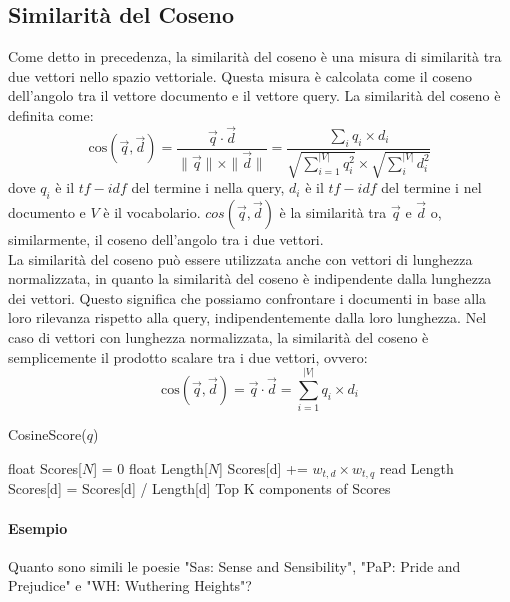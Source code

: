 \documentclass{report}
\begin{document}
	\subsection{Similarità del Coseno}
	Come detto in precedenza, la similarità del coseno è una misura di similarità tra due vettori nello spazio vettoriale. Questa misura è calcolata come il coseno dell'angolo tra il vettore documento e il vettore query. La similarità del coseno è definita come:
	\[
	\text{cos}(\overrightarrow{q}, \overrightarrow{d}) = \frac{\overrightarrow{q} \cdot \overrightarrow{d}}{\| \overrightarrow{q} \| \times \| \overrightarrow{d} \|} = \frac{\sum_{i} q_{i} \times d_{i}}{\sqrt{\sum_{i=1}^{|V|} q_{i}^{2}} \times \sqrt{\sum_{i}^{|V|} d_{i}^{2}}}
	\]
	dove $q_i$ è il $tf-idf$ del termine i nella query, $d_i$ è il $tf-idf$ del termine i nel documento e $V$ è il vocabolario. $cos(\overrightarrow{q}, \overrightarrow{d})$ è la similarità tra $\overrightarrow{q}$ e $\overrightarrow{d}$ o, similarmente, il coseno dell'angolo tra i due vettori.
	\vspace{\baselineskip}\\
	La similarità del coseno può essere utilizzata anche con vettori di lunghezza normalizzata, in quanto la similarità del coseno è indipendente dalla lunghezza dei vettori. Questo significa che possiamo confrontare i documenti in base alla loro rilevanza rispetto alla query, indipendentemente dalla loro lunghezza.
	Nel caso di vettori con lunghezza normalizzata, la similarità del coseno è semplicemente il prodotto scalare tra i due vettori, ovvero:
	\[
	\text{cos}(\overrightarrow{q}, \overrightarrow{d}) = \overrightarrow{q} \cdot \overrightarrow{d} = \sum_{i=1}^{|V|} q_{i} \times d_{i}
	\]
	\begin{algorithm}[H]
		\caption{CosineScore($q$)}
		\begin{algorithmic}
			\State float Scores[$N$] = 0
			\State float Length[$N$]
				\State Scores[d] += $w_{t,d} \times w_{t,q}$
			\EndFor
			\State read Length
				\State Scores[d] = Scores[d] / Length[d]
			\EndFor
			\State \Return Top K components of Scores
		\end{algorithmic}
	\end{algorithm}
	
	\paragraph{Esempio}
	Quanto sono simili le poesie "Sas: Sense and Sensibility", "PaP: Pride and Prejudice" e "WH: Wuthering Heights"?
\end{document}
